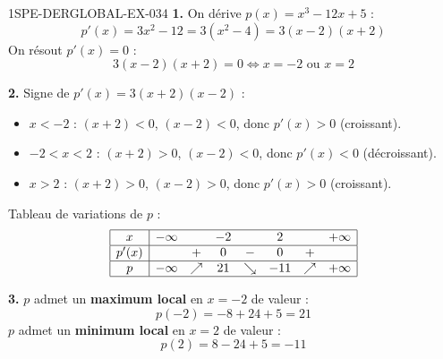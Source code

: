 \begin{corrige}{1SPE-DERGLOBAL-EX-034}
\textbf{1.} On dérive $p(x) = x^3 - 12x + 5$ :
\[
p'(x) = 3x^2 - 12 = 3(x^2 - 4) = 3(x-2)(x+2)
\]
On résout $p'(x) = 0$ :
\[
3(x-2)(x+2) = 0 \iff x = -2 \text{ ou } x = 2
\]

\textbf{2.} Signe de $p'(x) = 3(x+2)(x-2)$ :
\begin{itemize}
\item $x < -2$ : $(x+2) < 0$, $(x-2) < 0$, donc $p'(x) > 0$ (croissant).
\item $-2 < x < 2$ : $(x+2) > 0$, $(x-2) < 0$, donc $p'(x) < 0$ (décroissant).
\item $x > 2$ : $(x+2) > 0$, $(x-2) > 0$, donc $p'(x) > 0$ (croissant).
\end{itemize}

Tableau de variations de $p$ :
\[
\begin{array}{|c|ccccccc|}
\hline
x & -\infty & & -2 & & 2 & & +\infty \\
\hline
p'(x) & & + & 0 & - & 0 & + & \\
\hline
p & -\infty & \nearrow & 21 & \searrow & -11 & \nearrow & +\infty \\
\hline
\end{array}
\]

\textbf{3.} $p$ admet un \textbf{maximum local} en $x = -2$ de valeur :
\[
p(-2) = -8 + 24 + 5 = \boxed{21}
\]
$p$ admet un \textbf{minimum local} en $x = 2$ de valeur :
\[
p(2) = 8 - 24 + 5 = \boxed{-11}
\]
\end{corrige}
